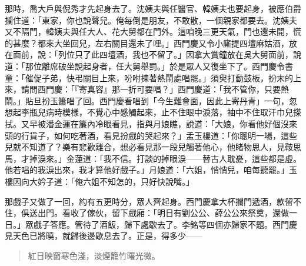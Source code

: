 那時，喬大戶與倪秀才先起身去了。沈姨夫與任醫官、韓姨夫也要起身，被應伯爵攔住道：「東家，你也說聲兒。俺每倒是朋友，不敢散，一個親家都要去。沈姨夫又不隔門，韓姨夫與任大人、花大舅都在門外。這咱晚三更天氣，門也還未開，慌的甚麼？都來大坐回兒，左右關目還未了哩。」西門慶又令小廝提四壇麻姑酒，放在面前，說：「列位只了此四壇酒，我也不留了。」因拿大賞鐘放在吳大舅面前，說道：「那位離席破坐說起身者，任大舅舉罰。」於是眾人又復坐下了。西門慶令書童：「催促子弟，快弔關目上來，吩咐揀著熱鬧處唱罷。」須臾打動鼓板，扮末的上來，請問西門慶：「『寄真容』那一折可要唱？」西門慶道：「我不管你，只要熱鬧。」貼旦扮玉簫唱了回。西門慶看唱到「今生難會面，因此上寄丹青」一句，忽想起李瓶兒病時模樣，不覺心中感觸起來，止不住眼中淚落，袖中不住取汗巾兒搽拭。又早被潘金蓮在簾內冷眼看見，指與月娘瞧，說道：「大娘，你看他好個沒來頭的行貨子，如何吃著酒，看見扮戲的哭起來？」盂玉樓道：「你聰明一場，這些兒就不知道了？樂有悲歡離合，想必看見那一段兒觸著他心，他睹物思人，見鞍思馬，才掉淚來。」金蓮道：「我不信。打談的掉眼淚——替古人耽憂，這些都是虛。他若唱的我淚出來，我才算他好戲子。」月娘道：「六姐，悄悄兒，咱每聽罷。」玉樓因向大妗子道：「俺六姐不知怎的，只好快說嘴。」

那戲子又做了一回，約有五更時分，眾人齊起身。西門慶拿大杯攔門遞酒，款留不住，俱送出門。看收了傢伙，留下戲廂：「明日有劉公公、薛公公來祭奠，還做一日。」眾戲子答應。管待了酒飯，歸下處歇去了。李銘等四個亦歸家不題。西門慶見天色已將曉，就歸後邊歇息去了。正是，得多少——
\begin{quote}
紅日映窗寒色淺，淡煙籠竹曙光微。
\end{quote}
